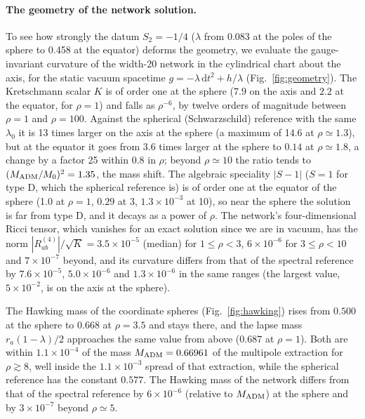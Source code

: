 \documentclass[aps,prd,twocolumn,superscriptaddress, nofootinbib,floatfix]{revtex4-2}
\newcommand{\dd}{\mathrm{d}}
\begin{document}
\paragraph{The geometry of the network solution.} To see how strongly the datum $S_2=-1/4$ ($\lambda$ from 0.083 at the poles of the sphere to 0.458 at the equator) deforms the geometry, we evaluate the gauge-invariant curvature of the width-20 network in the cylindrical chart about the axis, for the static vacuum spacetime $g=-\lambda\,\dd t^2+h/\lambda$ (Fig.~\ref{fig:geometry}).
The Kretschmann scalar $K$ is of order one at the sphere ($7.9$ on the axis and $2.2$ at the equator, for $\rho=1$) and falls as $\rho^{-6}$, by twelve orders of magnitude between $\rho=1$ and $\rho=100$.
Against the spherical (Schwarzschild) reference with the same $\lambda_0$ it is 13 times larger on the axis at the sphere (a maximum of 14.6 at $\rho\simeq1.3$), but at the equator it goes from 3.6 times larger at the sphere to $0.14$ at $\rho\simeq1.8$, a change by a factor 25 within 0.8 in $\rho$; beyond $\rho\simeq10$ the ratio tends to $(M_{\rm ADM}/M_0)^2=1.35$, the mass shift.
The algebraic speciality $|S-1|$ ($S=1$ for type D, which the spherical reference is) is of order one at the equator of the sphere (1.0 at $\rho=1$, $0.29$ at $3$, $1.3\times10^{-3}$ at 10), so near the sphere the solution is far from type D, and it decays as a power of $\rho$.
The network's four-dimensional Ricci tensor, which vanishes for an exact solution since we are in vacuum, has the norm $|R^{(4)}_{ab}|/\sqrt{K}=3.5\times10^{-5}$ (median) for $1\le\rho<3$, $6\times10^{-6}$ for $3\le\rho<10$ and $7\times10^{-7}$ beyond, and its curvature differs from that of the spectral reference by $7.6\times10^{-5}$, $5.0\times10^{-6}$ and $1.3\times10^{-6}$ in the same ranges (the largest value, $5\times10^{-2}$, is on the axis at the sphere).

The Hawking mass of the coordinate spheres (Fig.~\ref{fig:hawking}) rises from $0.500$ at the sphere to $0.668$ at $\rho=3.5$ and stays there, and the lapse mass $r_a(1-\lambda)/2$ approaches the same value from above ($0.687$ at $\rho=1$).
Both are within $1.1\times10^{-4}$ of the mass $M_{\rm ADM}=0.66961$ of the multipole extraction for $\rho\gtrsim8$, well inside the $1.1\times10^{-3}$ spread of that extraction, while the spherical reference has the constant $0.577$.
The Hawking mass of the network differs from that of the spectral reference by $6\times10^{-6}$ (relative to $M_{\rm ADM}$) at the sphere and by $3\times10^{-7}$ beyond $\rho\simeq5$.
\end{document}
